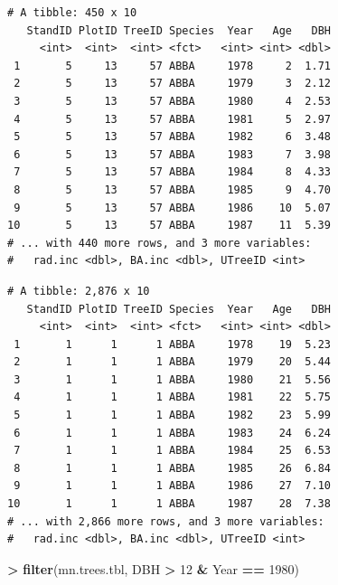 \documentclass[]{krantz}
\makeatletter
\newenvironment{Shaded}{\begin{snugshade}}{\end{snugshade}}
\newcommand{\KeywordTok}[1]{\textcolor[rgb]{0.27,0.27,0.27}{\textbf{#1}}}
\newcommand{\DecValTok}[1]{\textcolor[rgb]{0.06,0.06,0.06}{#1}}
\newcommand{\StringTok}[1]{\textcolor[rgb]{0.5,0.5,0.5}{#1}}
\newcommand{\OperatorTok}[1]{\textcolor[rgb]{0.43,0.43,0.43}{\textbf{#1}}}
\newcommand{\NormalTok}[1]{#1}
\newenvironment{kframe}{%
\medskip{}
\setlength{\fboxsep}{.8em}
 \def\at@end@of@kframe{}%
 \ifinner\ifhmode%
  \def\at@end@of@kframe{\end{minipage}}%
  \begin{minipage}{\columnwidth}%
 \fi\fi%
 \def\FrameCommand##1{\hskip\@totalleftmargin \hskip-\fboxsep
 \colorbox{shadecolor}{##1}\hskip-\fboxsep
     \hskip-\linewidth \hskip-\@totalleftmargin \hskip\columnwidth}%
 \MakeFramed {\advance\hsize-\width
   \@totalleftmargin\z@ \linewidth\hsize
   \@setminipage}}%
 {\par\unskip\endMakeFramed%
 \at@end@of@kframe}
\renewenvironment{Shaded}{\begin{kframe}}{\end{kframe}}
\theoremstyle{definition}
\theoremstyle{definition}
\theoremstyle{definition}
\theoremstyle{remark}
\makeatother
\begin{document}
\begin{verbatim}
# A tibble: 450 x 10
   StandID PlotID TreeID Species  Year   Age   DBH
     <int>  <int>  <int> <fct>   <int> <int> <dbl>
 1       5     13     57 ABBA     1978     2  1.71
 2       5     13     57 ABBA     1979     3  2.12
 3       5     13     57 ABBA     1980     4  2.53
 4       5     13     57 ABBA     1981     5  2.97
 5       5     13     57 ABBA     1982     6  3.48
 6       5     13     57 ABBA     1983     7  3.98
 7       5     13     57 ABBA     1984     8  4.33
 8       5     13     57 ABBA     1985     9  4.70
 9       5     13     57 ABBA     1986    10  5.07
10       5     13     57 ABBA     1987    11  5.39
# ... with 440 more rows, and 3 more variables:
#   rad.inc <dbl>, BA.inc <dbl>, UTreeID <int>
\end{verbatim}

\begin{Shaded}
\end{Shaded}

\begin{verbatim}
# A tibble: 2,876 x 10
   StandID PlotID TreeID Species  Year   Age   DBH
     <int>  <int>  <int> <fct>   <int> <int> <dbl>
 1       1      1      1 ABBA     1978    19  5.23
 2       1      1      1 ABBA     1979    20  5.44
 3       1      1      1 ABBA     1980    21  5.56
 4       1      1      1 ABBA     1981    22  5.75
 5       1      1      1 ABBA     1982    23  5.99
 6       1      1      1 ABBA     1983    24  6.24
 7       1      1      1 ABBA     1984    25  6.53
 8       1      1      1 ABBA     1985    26  6.84
 9       1      1      1 ABBA     1986    27  7.10
10       1      1      1 ABBA     1987    28  7.38
# ... with 2,866 more rows, and 3 more variables:
#   rad.inc <dbl>, BA.inc <dbl>, UTreeID <int>
\end{verbatim}

\begin{Shaded}
\begin{Highlighting}[]
\OperatorTok{>}\StringTok{ }\KeywordTok{filter}\NormalTok{(mn.trees.tbl, DBH }\OperatorTok{>}\StringTok{ }\DecValTok{12} \OperatorTok{&}\StringTok{ }\NormalTok{Year }\OperatorTok{==}\StringTok{ }\DecValTok{1980}\NormalTok{)}
\end{Highlighting}
\end{Shaded}
\end{document}
